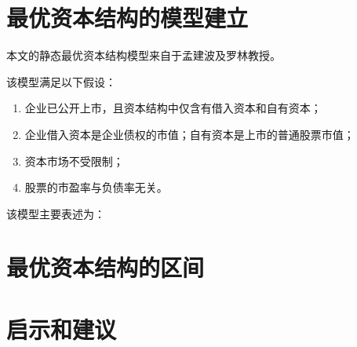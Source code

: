 \section{最优资本结构的模型建立}
本文的静态最优资本结构模型来自于孟建波及罗林教授\cite{Sun2020}。

该模型满足以下假设：
\begin{enumerate}[label=(\arabic*)]
    \item 企业已公开上市，且资本结构中仅含有借入资本和自有资本；
    \item 企业借入资本是企业债权的市值；自有资本是上市的普通股票市值；
    \item 资本市场不受限制；
    \item 股票的市盈率与负债率无关。
\end{enumerate}
该模型主要表述为：

\section{最优资本结构的区间}

\section{启示和建议}
